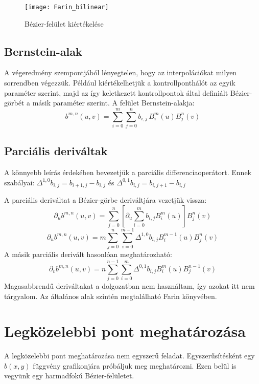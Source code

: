 \begin{figure}[H]
	\centering
	\texttt{[image: Farin\_bilinear]}
	\caption{Bézier-felület kiértékelése \cite[248. o.]{farin2002curves}}
\end{figure}

\subsection{Bernstein-alak}
A végeredmény szempontjából lényegtelen, hogy az interpolációkat milyen sorrendben végezzük. Például kiértékelhetjük a kontrollponthálót az egyik paraméter szerint, majd az így keletkezett kontrollpontok által definiált Bézier-görbét a másik paraméter szerint. \cite[251. o.]{farin2002curves} A felület Bernstein-alakja:
$$ b^{m,n}(u,v) = \sum_{i=0}^m \sum_{j=0}^n b_{i,j}\, B^m_i(u) B^n_j(v) $$

\subsection{Parciális deriváltak}
A könnyebb leírás érdekében bevezetjük a parciális differenciaoperátort. Ennek szabályai: $\Delta^{1,0}b_{i,j} = b_{i+1,j} - b_{i,j}$ és  $\Delta^{0,1}b_{i,j} = b_{i,j+1} - b_{i,j}$

A parciális deriváltat a Bézier-görbe deriváltjára vezetjük vissza:
$$ \partial_u b^{m,n}(u,v) = \sum_{j=0}^n \left[\partial_u \sum_{i=0}^m b_{i,j} B^m_i(u) \right] B^n_j(v) $$
$$ \partial_u b^{m,n}(u,v) = m\sum_{j=0}^n \sum_{i=0}^{m-1} \Delta^{1,0} b_{i,j} B^{m-1}_i(u)  B^n_j(v) $$
A másik parciális derivált hasonlóan meghatározható:
$$ \partial_v b^{m,n}(u,v) = n\sum_{j=0}^{n-1} \sum_{i=0}^m \Delta^{0,1} b_{i,j} B^m_i(u)  B^{n-1}_j(v) $$
Magasabbrendű deriváltakat a dolgozatban nem használtam, így azokat itt nem tárgyalom. Az általános alak szintén megtalálható Farin könyvében. \cite[257. o.]{farin2002curves}



\section{Legközelebbi pont meghatározása}

A legközelebbi pont meghatározása nem egyszerű feladat. Egyszerűsítésként egy $b(x,y)$ függvény grafikonjára próbáljuk meg meghatározni. Ezen belül is vegyünk egy harmadfokú Bézier-felületet.

